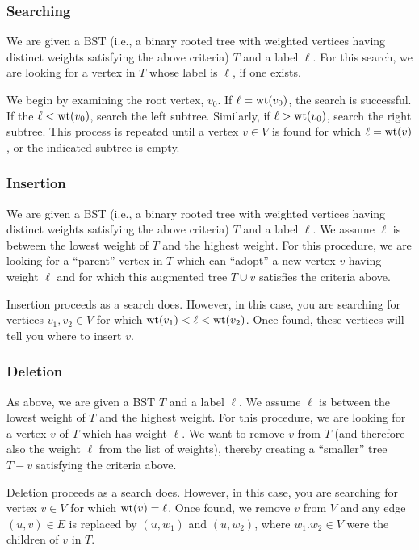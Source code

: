 \subsubsection{Searching}

We are given a BST (i.e., a binary rooted tree with weighted vertices
having distinct weights satisfying the above criteria) $T$ and a
label $\ell$. For this search, we are looking for a vertex in $T$
whose label is $\ell$, if one exists.

We begin by examining the root vertex, $v_0$. If $\ell={\rm wt}(v_0)$,
the search is successful. If the $\ell<{\rm wt}(v_0)$,
search the left subtree. Similarly, if $\ell>{\rm wt}(v_0)$,
search the right subtree. This process is repeated until a vertex
$v\in V$ is found for which $\ell={\rm wt}(v)$,
or the indicated subtree is empty.


\subsubsection{Insertion}

We are given a BST (i.e., a binary rooted tree with weighted vertices
having distinct weights satisfying the above criteria) $T$ and a
label $\ell$. We assume $\ell$ is between the
lowest weight of $T$ and the highest weight.
For this procedure, we are looking for a ``parent''
vertex in $T$ which can ``adopt'' a new vertex $v$ having weight $\ell$
and for which this augmented tree $T\cup v$ satisfies
the criteria above.

Insertion proceeds as a search does. However, in this case, you are
searching for vertices $v_1,v_2\in V$ for which
${\rm wt}(v_1)<\ell < {\rm wt}(v_2)$. Once found, these
vertices will tell you where to insert $v$.

\subsubsection{Deletion}

As above, we are given a BST $T$ and a
label $\ell$. We assume $\ell$ is between the
lowest weight of $T$ and the highest weight.
For this procedure, we are looking for a vertex $v$ of
$T$ which has weight $\ell$. We want to remove $v$ from
$T$ (and therefore also the weight $\ell$ from the list of weights),
thereby creating a ``smaller'' tree $T- v$ satisfying
the criteria above.

Deletion proceeds as a search does. However, in this case, you are
searching for vertex $v\in V$ for which
${\rm wt}(v)=\ell$. Once found, we remove $v$ from $V$
and any edge $(u,v)\in E$ is replaced by $(u,w_1)$
and $(u,w_2)$, where $w_1.w_2\in V$ were the children of $v$
in $T$.

